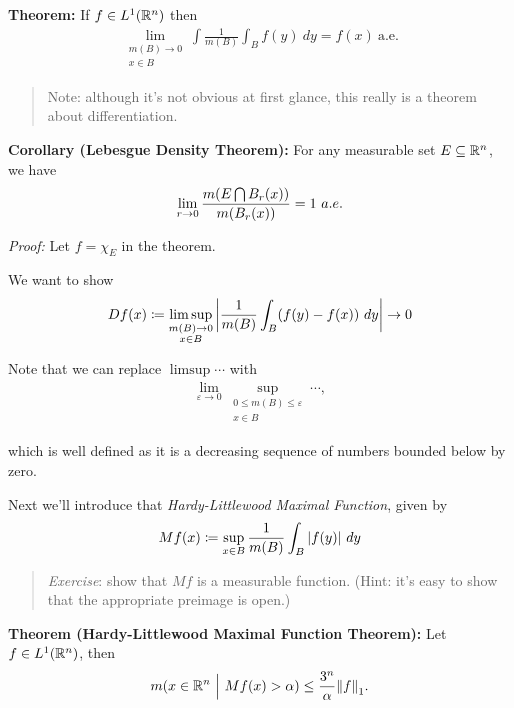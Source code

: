 \textbf{Theorem:} If \(f\in L^1({\mathbb{R}}^n)\) then
\begin{align*}
\lim_{\substack{m(B) \to 0 \\ x\in B}} \int \frac{1}{m(B)} \int_B f(y)~dy = f(x) ~\text{a.e.}
\end{align*}

\begin{quote}
Note: although it's not obvious at first glance, this really is a
theorem about differentiation.
\end{quote}

\textbf{Corollary (Lebesgue Density Theorem):} For any measurable set
\(E \subseteq {\mathbb{R}}^n\), we have
\begin{align*}
\lim_{r\to 0} \frac{m(E\bigcap B_r(x))}{m(B_r(x))} = 1 ~a.e.
\end{align*}

\emph{Proof:} Let \(f = \chi_E\) in the theorem.

We want to show
\begin{align*}
Df(x) \coloneqq \limsup_{\substack{m(B) \to 0 \\ x\in B}} {\left\lvert {\frac{1}{m(B)} \int_B (f(y) - f(x))~dy  } \right\rvert} \to 0
\end{align*}

Note that we can replace \(\limsup \cdots\) with
\begin{align*}
\lim_{\varepsilon \to 0} \sup_{\substack{0\leq m(B) \leq \varepsilon \\ x\in B}} \cdots
,\end{align*}

which is well defined as it is a decreasing sequence of numbers bounded
below by zero.

Next we'll introduce that \emph{Hardy-Littlewood Maximal Function},
given by
\begin{align*}
Mf(x) \coloneqq \sup_{x\in B} \frac{1}{m(B)} \int_B {\left\lvert {f(y)} \right\rvert} ~dy
\end{align*}

\begin{quote}
\emph{Exercise}: show that \(Mf\) is a measurable function. (Hint: it's
easy to show that the appropriate preimage is open.)
\end{quote}

\textbf{Theorem (Hardy-Littlewood Maximal Function Theorem):} Let
\(f\in L^1({\mathbb{R}}^n)\), then
\begin{align*}
m({ x\in {\mathbb{R}}^n {~\mathrel{\Big|}~} Mf(x) > \alpha  }) \leq \frac{3^n}{\alpha} {\left\lVert {f} \right\rVert}_1.
\end{align*}

